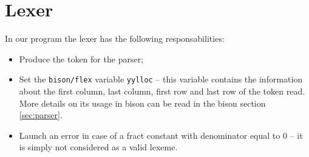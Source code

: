 \section{Lexer}
In our program the lexer has the following responsabilities:
\begin{itemize}
\item Produce the token for the parser;
\item Set the \verb|bison/flex| variable \verb|yylloc| -- this 
variable contains the information about the first column, last column,
first row and last row of the token read. More details on its usage in
bison can be read in the bison section \ref{sec:parser}.
\item Launch an error in case of a fract constant with denominator equal
to $0$ -- it is simply not considered as a valid lexeme.
\end{itemize}
